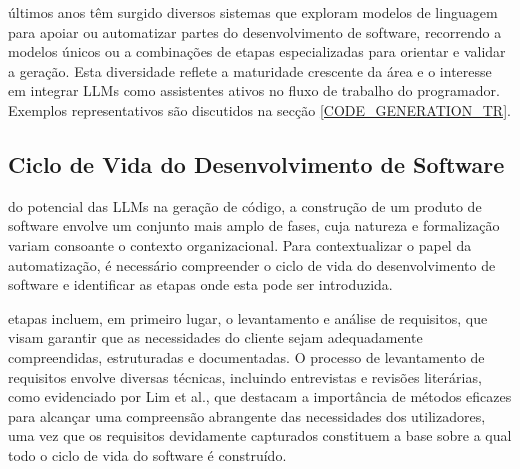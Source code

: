 
 últimos anos têm surgido diversos sistemas que exploram modelos de linguagem para apoiar ou automatizar partes do desenvolvimento de software, recorrendo a modelos únicos ou a combinações de etapas especializadas para orientar e validar a geração. Esta diversidade reflete a maturidade crescente da área e o interesse em integrar LLMs como assistentes ativos no fluxo de trabalho do programador. Exemplos representativos são discutidos na secção \ref{CODE_GENERATION_TR}.\\\par

\subsection{Ciclo de Vida do Desenvolvimento de Software}

 do potencial das LLMs na geração de código, a construção de um produto de software envolve um conjunto mais amplo de fases, cuja natureza e formalização variam consoante o contexto organizacional. Para contextualizar o papel da automatização, é necessário compreender o ciclo de vida do desenvolvimento de software\cite{ALLLIFECYCLE} e identificar as etapas onde esta pode ser introduzida.\\\par

 etapas incluem, em primeiro lugar, o levantamento e análise de requisitos, que visam garantir que as necessidades do cliente sejam adequadamente compreendidas, estruturadas e documentadas. O processo de levantamento de requisitos envolve diversas técnicas, incluindo entrevistas e revisões literárias, como evidenciado por Lim et al.\cite{RE}, que destacam a importância de métodos eficazes para alcançar uma compreensão abrangente das necessidades dos utilizadores, uma vez que os requisitos devidamente capturados constituem a base sobre a qual todo o ciclo de vida do software é construído.\par

